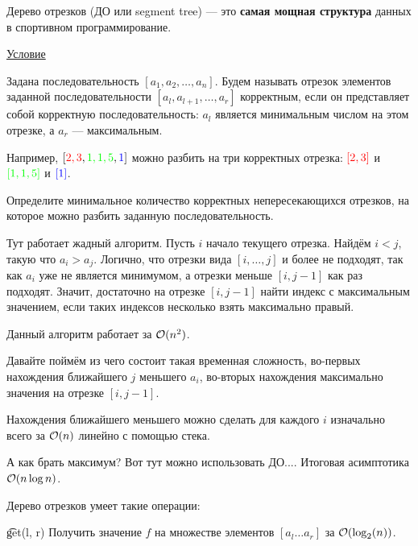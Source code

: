 
Дерево отрезков (ДО или segment tree) --- это {\bf самая мощная структура} данных в спортивном программирование.


\down

\href{https://codeforces.com/gym/102154/problem/B}{Условие}


\down

Задана последовательность $[a_1, a_2, \dots, a_n]$. Будем называть отрезок элементов заданной последовательности $[a_l, a_{l + 1}, \dots, a_r]$ корректным, если он представляет собой корректную последовательность: $a_l$ является минимальным числом на этом отрезке, а $a_r$ — максимальным.

Например, $[{\color{red}{2,3}}, {\color{green}{1,1,5}}, {\color{blue}{1}}]$ можно разбить на три корректных отрезка: ${\color{red}{[2,3]}}$ и ${\color{green}{[1,1,5]}}$ и ${\color{blue}{[1]}}$.

\down

Определите минимальное количество корректных непересекающихся отрезков, на которое можно разбить заданную последовательность. 

\down

Тут работает жадный алгоритм. Пусть $i$ начало текущего отрезка. Найдём $i < j$, такую что $a_i > a_j$. Логично, что отрезки вида $[i, \dots, j]$ и более не подходят, так как $a_i$ уже не является минимумом, а отрезки меньше $[i, j - 1]$ как раз подходят. Значит, достаточно на отрезке $[i, j - 1]$ найти индекс с максимальным значением, если таких индексов несколько взять максимально правый.

Данный алгоритм работает за $ \mathcal{O}(n^2)$.

\down

Давайте поймём из чего состоит такая временная сложность, во-первых нахождения ближайшего $j$ меньшего $a_i$, во-вторых нахождения максимально значения на отрезке $[i, j - 1]$.

Нахождения ближайшего меньшего можно сделать для каждого $i$ изначально всего за $ \mathcal{O}(n)$ линейно с помощью стека.

А как брать максимум? Вот тут можно использовать ДО.... Итоговая асимптотика $ \mathcal{O}(n \log n)$.

\pagebreak	

Дерево отрезков умеет такие операции:

\t{get(l, r)} Получить значение $f$ на множестве элементов $[a_l \ldots a_r]$ за $ \mathcal{O}(\log_2(n))$.

